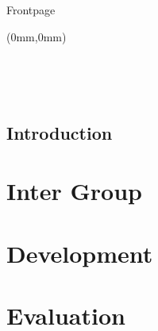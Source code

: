 
%

	Frontpage
	\listoftodos
	\begin{titlepage}
	\begin{textblock*}{297mm}(0mm,0mm)
		 \hspace{-6.5mm}

		

	\end{textblock*}
	\thispagestyle{empty}

\ \pagebreak{} 
	\end{titlepage}
\ \thispagestyle{empty} \ \pagebreak{}



\tableofcontents
\cleardoublepage
	
\newpage
\thispagestyle{empty}
\begin{titlepage}
\end{titlepage}
	
	\chapter{Introduction}
	\part{Inter Group}
	
	
	
	
	
 
\part{Development}

	
	
	
	
	
	
	
	
	
	
	
\part{Evaluation}
	
